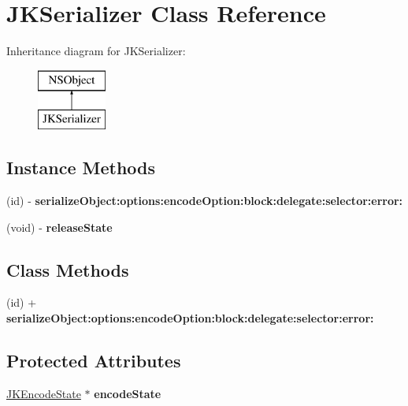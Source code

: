 \hypertarget{interface_j_k_serializer}{\section{J\-K\-Serializer Class Reference}
\label{interface_j_k_serializer}
}
Inheritance diagram for J\-K\-Serializer\-:\begin{figure}[H]
\begin{center}
\leavevmode
\includegraphics[height=2.000000cm]{interface_j_k_serializer}
\end{center}
\end{figure}
\subsection*{Instance Methods}
\begin{DoxyCompactItemize}
\item 
\hypertarget{interface_j_k_serializer_a646d110b95004ade609c21167c488728}{(id) -\/ {\bfseries serialize\-Object\-:options\-:encode\-Option\-:block\-:delegate\-:selector\-:error\-:}}\label{interface_j_k_serializer_a646d110b95004ade609c21167c488728}

\item 
\hypertarget{interface_j_k_serializer_a64763abf0d1a7a31058f4be44f6fb9cd}{(void) -\/ {\bfseries release\-State}}\label{interface_j_k_serializer_a64763abf0d1a7a31058f4be44f6fb9cd}

\end{DoxyCompactItemize}
\subsection*{Class Methods}
\begin{DoxyCompactItemize}
\item 
\hypertarget{interface_j_k_serializer_a646d110b95004ade609c21167c488728}{(id) + {\bfseries serialize\-Object\-:options\-:encode\-Option\-:block\-:delegate\-:selector\-:error\-:}}\label{interface_j_k_serializer_a646d110b95004ade609c21167c488728}

\end{DoxyCompactItemize}
\subsection*{Protected Attributes}
\begin{DoxyCompactItemize}
\item 
\hypertarget{interface_j_k_serializer_a2726ee485912252e5225b8d4a8223f99}{\hyperlink{struct_j_k_encode_state}{J\-K\-Encode\-State} $\ast$ {\bfseries encode\-State}}\label{interface_j_k_serializer_a2726ee485912252e5225b8d4a8223f99}

\end{DoxyCompactItemize}


